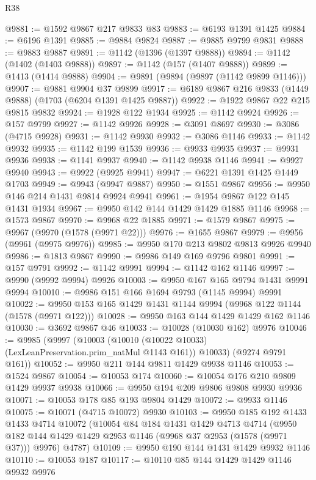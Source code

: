 \begin{lexlean}{R38}
\begin{coremodule}
@9881 := @1592 @9867 @217 @9833 @83
@9883 := @6193 @1391 @1425
@9884 := @6196 @1391
@9885 := @9884 @9824
@9887 := @9885 @9799 @9831
@9888 := @9883 @9887
@9891 := @1142 (@1396 (@1397 @9888))
@9894 := @1142 (@1402 (@1403 @9888))
@9897 := @1142 (@157 (@1407 @9888))
@9899 := @1413 (@1414 @9888)
@9904 := @9891 (@9894 (@9897 (@1142 @9899 @1146)))
@9907 := @9881 @9904 @37 @9899
@9917 := @6189 @9867 @216 @9833 (@1449 @9888) (@1703 (@6204 @1391 @1425 @9887))
@9922 := @1922 @9867 @22 @215 @9815 @9832
@9924 := @1928 @122 @1934
@9925 := @1142 @9924
@9926 := @157 @9799
@9927 := @1142 @9926
@9928 := @3091 @8697
@9930 := @3086 (@4715 @9928)
@9931 := @1142 @9930
@9932 := @3086 @1146
@9933 := @1142 @9932
@9935 := @1142 @199 @1539
@9936 := @9933 @9935
@9937 := @9931 @9936
@9938 := @1141 @9937
@9940 := @1142 @9938 @1146
@9941 := @9927 @9940
@9943 := @9922 (@9925 @9941)
@9947 := @6221 @1391 @1425 @1449 @1703
@9949 := @9943 (@9947 @9887)
@9950 := @1551 @9867
@9956 := @9950 @146 @214 @1431 @9814 @9924 @9941
@9961 := @1954 @9867 @122 @145 @1431 @1934
@9967 := @9950 @142 @144 @1429 @1429 @1885 @1146
@9968 := @1573 @9867
@9970 := @9968 @22 @1885
@9971 := @1579 @9867
@9975 := @9967 (@9970 (@1578 (@9971 @22)))
@9976 := @1655 @9867
@9979 := @9956 (@9961 (@9975 @9976))
@9985 := @9950 @170 @213 @9802 @9813 @9926 @9940
@9986 := @1813 @9867
@9990 := @9986 @149 @169 @9796 @9801
@9991 := @157 @9791
@9992 := @1142 @9991
@9994 := @1142 @162 @1146
@9997 := @9990 (@9992 @9994) @9926
@10003 := @9950 @167 @165 @9794 @1431 @9991 @9994
@10010 := @9986 @151 @166 @1694 @9793 (@1145 @9994) @9991
@10022 := @9950 @153 @165 @1429 @1431 @1144 @9994 (@9968 @122 @1144 (@1578 (@9971 @122)))
@10028 := @9950 @163 @144 @1429 @1429 @162 @1146
@10030 := @3692 @9867 @46
@10033 := @10028 (@10030 @162) @9976
@10046 := @9985
    (@9997
      (@10003 (@10010 (@10022 @10033) (LexLeanPreservation.prim_natMul @1143 @161)) @10033)
      (@9274 @9791 @161))
@10052 := @9950 @211 @144 @9811 @1429 @9938 @1146
@10053 := @1524 @9867
@10054 := @10053 @174
@10060 := @10054 @176 @210 @9809 @1429 @9937 @9938
@10066 := @9950 @194 @209 @9806 @9808 @9930 @9936
@10071 := @10053 @178 @85 @193 @9804 @1429
@10072 := @9933 @1146
@10075 := @10071 (@4715 @10072) @9930
@10103 := @9950
    @185
    @192
    @1433
    @1433
    @4714
    @10072
    (@10054
      @84
      @184
      @1431
      @1429
      @4713
      @4714
      (@9950 @182 @144 @1429 @1429 @2953 @1146 (@9968 @37 @2953 (@1578 (@9971 @37))) @9976)
      @4787)
@10109 := @9950 @190 @144 @1431 @1429 @9932 @1146
@10110 := @10053 @187
@10117 := @10110 @85 @144 @1429 @1429 @1146 @9932 @9976

\end{coremodule}
\end{lexlean}
